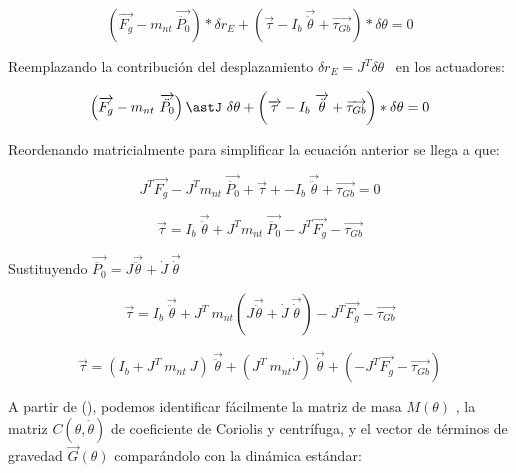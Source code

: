                  \[  \left( \overrightarrow{F_{g}}-m_{nt}~\overrightarrow{\ddot{P_{0}}} \right) \ast \delta r_{E}+  \left( \overrightarrow{ \tau}-I_{b}~\overrightarrow{\ddot{ \theta }}+\overrightarrow{ \tau_{Gb}} \right) \ast \delta  \theta =0 \] 
                
                Reemplazando la contribución del desplazamiento  \(  \delta r_{E}=J^{T} \delta  \theta  \) \  en los actuadores:
                
                 \[  \left( \overrightarrow{F_{g}}-m_{nt}~\overrightarrow{\ddot{P_{0}}} \right) \astJ~ \delta  \theta +  \left( \overrightarrow{ \tau}-I_{b}~\overrightarrow{\ddot{ \theta }}+\overrightarrow{ \tau_{Gb}} \right) \ast \delta  \theta =0 \] 
                
                Reordenando matricialmente para simplificar la ecuación anterior se llega a que: 
                
                 \[ J^{T}\overrightarrow{F_{g}}-J^{T}m_{nt}~\overrightarrow{\ddot{P_{0}}}+\overrightarrow{ \tau}+-I_{b}~\overrightarrow{\ddot{ \theta }}+\overrightarrow{ \tau_{Gb}}=0 \] 
                
                 \[ \overrightarrow{ \tau}=I_{b}~\overrightarrow{\ddot{ \theta }}+J^{T}m_{nt}~\overrightarrow{\ddot{P_{0}}}- J^{T}\overrightarrow{F_{g}}-\overrightarrow{ \tau_{Gb}} \] 
                
                Sustituyendo  \( \overrightarrow{\ddot{P_{0}}}=J\overrightarrow{\ddot{ \theta }}+\dot{J}~\overrightarrow{\dot{ \theta }} \) 
                
                 \[ \overrightarrow{ \tau}=I_{b}~\overrightarrow{\ddot{ \theta }}+J^{T}~m_{nt}  \left( J\overrightarrow{\ddot{ \theta }}+\dot{J}~\overrightarrow{\dot{ \theta }} \right) - J^{T}\overrightarrow{F_{g}}-\overrightarrow{ \tau_{Gb}} \] 
                
                 \[ \overrightarrow{ \tau}= \left( I_{b}+J^{T}~m_{nt}~J \right) ~\overrightarrow{\ddot{ \theta }}+ \left( J^{T}~m_{nt}\dot{J} \right) ~\overrightarrow{\dot{ \theta }}+ \left( - J^{T}\overrightarrow{F_{g}}-\overrightarrow{ \tau_{Gb}} \right)  \] 
                
                A partir de (), podemos identificar fácilmente la matriz de masa  \( M \left(  \theta  \right)  \) , la matriz  \( C \left(  \theta ,\dot{ \theta } \right)  \)  de coeficiente de Coriolis y centrífuga, y el vector de términos de gravedad  \( \overrightarrow{G} \left(  \theta  \right)  \)  comparándolo con la dinámica estándar:
                
